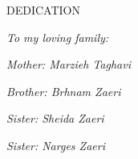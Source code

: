 \newpage


\begin{center}
DEDICATION
\end{center}
\begin{dedication}
\begin{center}
\textit{To my loving family:}
\end{center}
\begin{center}
	\textit{Mother: Marzieh Taghavi}
\end{center}

\begin{center}
	\textit{Brother: Brhnam Zaeri}
\end{center}

\begin{center}
	\textit{Sister: Sheida Zaeri}
\end{center}

\begin{center}
	\textit{Sister: Narges Zaeri}
\end{center}
\end{dedication}